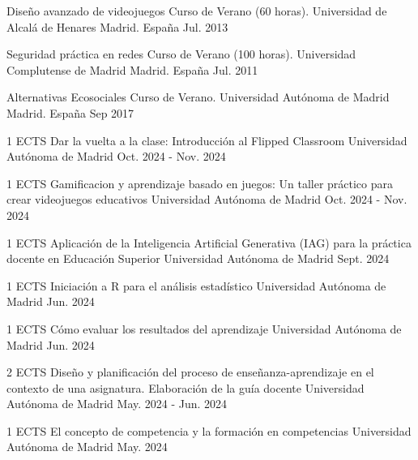 \begin{cvhonors}
   \cvhonor
	{Diseño avanzado de videojuegos} %
	{Curso de Verano (60 horas). Universidad de Alcalá de Henares}
	{Madrid. España} %
	{Jul. 2013} %
	
   \cvhonor
	{Seguridad práctica en redes} %
	{Curso de Verano (100 horas). Universidad Complutense de Madrid}
	{Madrid. España} %
	{Jul. 2011} %
	
   \cvhonor
	{Alternativas Ecosociales} %
	{Curso de Verano. Universidad Autónoma de Madrid}
	{Madrid. España} %
	{Sep 2017} %
\end{cvhonors}

\begin{cventries}

   \cventry
	{1 ECTS} %
	{Dar la vuelta a la clase: Introducción al Flipped Classroom} %
	{Universidad Autónoma de Madrid} %
	{Oct. 2024 - Nov. 2024} %
	{}

  \cventry
    {1 ECTS} %
    {Gamificacion y aprendizaje basado en juegos: Un taller práctico para crear videojuegos educativos} %
    {Universidad Autónoma de Madrid} %
    {Oct. 2024 - Nov. 2024} %
    {}

  \cventry
	{1 ECTS} %
	{Aplicación de la Inteligencia Artificial Generativa (IAG) para la práctica docente en Educación Superior} %
	{Universidad Autónoma de Madrid} %
	{Sept. 2024} %
	{}
	
	  \cventry
    {1 ECTS} %
    {Iniciación a R para el análisis estadístico
} %
    {Universidad Autónoma de Madrid} %
    {Jun. 2024} %
    {}
    
	  \cventry
    {1 ECTS} %
    {Cómo evaluar los resultados del aprendizaje} %
    {Universidad Autónoma de Madrid} %
    {Jun. 2024} %
    {}

	  \cventry
    {2 ECTS} %
    {Diseño y planificación del proceso de enseñanza-aprendizaje en el contexto de una asignatura. Elaboración de la guía docente} %
    {Universidad Autónoma de Madrid} %
    {May. 2024 - Jun. 2024} %
    {}
    
	  \cventry
    {1 ECTS} %
    {El concepto de competencia y la formación en competencias} %
    {Universidad Autónoma de Madrid} %
    {May. 2024} %
    {}


\end{cventries}
